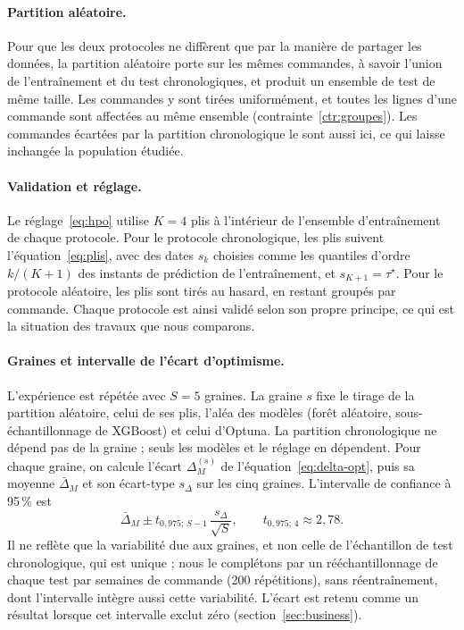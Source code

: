 \documentclass[11pt,a4paper]{article}
\theoremstyle{definition}
\begin{document}
\paragraph{Partition aléatoire.} Pour que les deux protocoles ne diffèrent que par la manière de partager les données, la partition aléatoire porte sur les mêmes commandes, à savoir l'union de l'entraînement et du test chronologiques, et produit un ensemble de test de même taille. Les commandes y sont tirées uniformément, et toutes les lignes d'une commande sont affectées au même ensemble (contrainte~\ref{ctr:groupes}). Les commandes écartées par la partition chronologique le sont aussi ici, ce qui laisse inchangée la population étudiée.

\paragraph{Validation et réglage.} Le réglage~\eqref{eq:hpo} utilise $K = 4$ plis à l'intérieur de l'ensemble d'entraînement de chaque protocole. Pour le protocole chronologique, les plis suivent l'équation~\eqref{eq:plis}, avec des dates $s_k$ choisies comme les quantiles d'ordre $k/(K+1)$ des instants de prédiction de l'entraînement, et $s_{K+1} = \tau^\star$. Pour le protocole aléatoire, les plis sont tirés au hasard, en restant groupés par commande. Chaque protocole est ainsi validé selon son propre principe, ce qui est la situation des travaux que nous comparons.

\paragraph{Graines et intervalle de l'écart d'optimisme.} L'expérience est répétée avec $S = 5$ graines. La graine $s$ fixe le tirage de la partition aléatoire, celui de ses plis, l'aléa des modèles (forêt aléatoire, sous-échantillonnage de XGBoost) et celui d'Optuna. La partition chronologique ne dépend pas de la graine ; seuls les modèles et le réglage en dépendent. Pour chaque graine, on calcule l'écart $\Delta_M^{(s)}$ de l'équation~\eqref{eq:delta-opt}, puis sa moyenne $\bar\Delta_M$ et son écart-type $s_\Delta$ sur les cinq graines. L'intervalle de confiance à 95\,\% est
\begin{equation}
  \bar\Delta_M \pm t_{0{,}975;\,S-1}\,\frac{s_\Delta}{\sqrt{S}}, \qquad t_{0{,}975;\,4} \approx 2{,}78.
  \label{eq:ic-delta}
\end{equation}
Il ne reflète que la variabilité due aux graines, et non celle de l'échantillon de test chronologique, qui est unique ; nous le complétons par un rééchantillonnage de chaque test par semaines de commande (200 répétitions), sans réentraînement, dont l'intervalle intègre aussi cette variabilité. L'écart est retenu comme un résultat lorsque cet intervalle exclut zéro (section~\ref{sec:business}).
\end{document}
